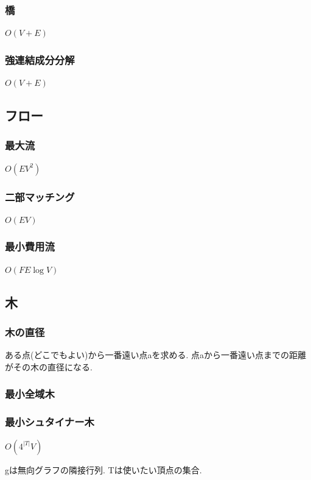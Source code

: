 \documentclass[9pt,twocolumn,a4paper,landscape]{extarticle}
\begin{document}
\subsubsection{橋}
$O(V+E)$\par


\subsubsection{強連結成分分解}
$O(V+E)$\par


\subsection{フロー}
\subsubsection{最大流}
$O(EV^2)$\par


\subsubsection{二部マッチング}
$O(EV)$\par


\subsubsection{最小費用流}
$O(FE\log V)$\par


\subsection{木}
\subsubsection{木の直径}
ある点(どこでもよい)から一番遠い点aを求める. 点aから一番遠い点までの距離がその木の直径になる.\par
\subsubsection{最小全域木}

\subsubsection{最小シュタイナー木}
$O(4^{|T|}V)$ \par
gは無向グラフの隣接行列. Tは使いたい頂点の集合.\par

\end{document}
